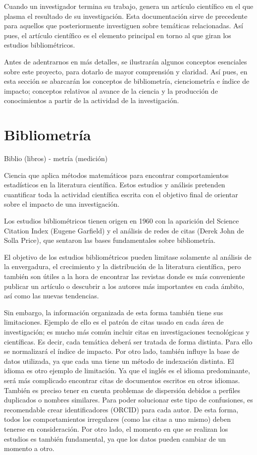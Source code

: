 
Cuando un investigador termina su trabajo, genera un artículo científico en el que plasma el resultado de su investigación. Esta documentación sirve de precedente para aquellos que posteriormente investiguen sobre temáticas relacionadas. Así pues, el artículo científico es el elemento principal en torno al que giran los estudios bibliométricos.

Antes de adentrarnos en más detalles, se ilustrarán algunos conceptos esenciales sobre este proyecto, para dotarlo de mayor comprensión y claridad. Así pues, en esta sección se abarcarán los conceptos de bibliometría, cienciometría e índice de impacto; conceptos relativos al avance de la ciencia y la producción de conocimientos a partir de la actividad de la investigación.


\section{Bibliometría}

Biblio (libros) - metría (medición)

Ciencia que aplica métodos matemáticos para encontrar comportamientos estadísticos en la literatura científica. Estos estudios y análisis pretenden cuantificar toda la actividad científica escrita con el objetivo final de orientar sobre el impacto de una investigación.

Los estudios bibliométricos tienen origen en 1960 con la aparición del Science Citation Index (Eugene Garfield) y el análisis de redes de citas (Derek John de Solla Price), que sentaron las bases fundamentales sobre bibliometría.

El objetivo de los estudios bibliométricos pueden limitase solamente al análisis de la envergadura, el crecimiento y la distribución de la literatura científica, pero también son útiles a la hora de encontrar las revistas donde es más conveniente publicar un artículo o descubrir a los autores más importantes en cada ámbito, así como las nuevas tendencias.

Sin embargo, la información organizada de esta forma también tiene sus limitaciones. Ejemplo de ello es el patrón de citas usado en cada área de investigación; es mucho más común incluir citas en investigaciones tecnológicas y científicas. Es decir, cada temática deberá ser tratada de forma distinta. Para ello se normalizará el índice de impacto.
Por otro lado, también influye la base de datos utilizada, ya que cada una tiene un método de indexación distinta.
El idioma es otro ejemplo de limitación. Ya que el inglés es el idioma predominante, será más complicado encontrar citas de documentos 	escritos en otros idiomas.
También es preciso tener en cuenta problemas de dispersión debidos a perfiles duplicados o nombres similares. Para poder solucionar este tipo de confusiones, es recomendable crear identificadores (ORCID) para cada autor.
De esta forma, todos los comportamientos irregulares (como las citas a uno mismo) deben tenerse en consideración.
Por otro lado, el momento en que se realizan los estudios es también fundamental, ya que los datos pueden cambiar de un momento a otro.

